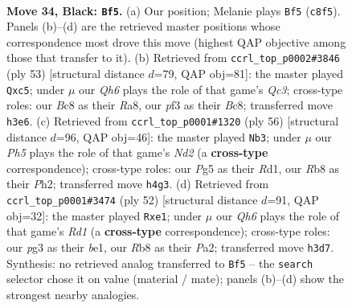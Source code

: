 \documentclass[11pt]{article}
\begin{document}
\clearpage

\begin{figure}[p]\centering
\begin{subfigure}{0.46\textwidth}\centering
\resizebox{\linewidth}{!}{%
\newchessgame
\chessboard[
  setfen={1rb5/pp4k1/n5p1/2pP2p1/7p/P2Q1PPq/1PB4P/2RR2K1 b - - 1 34},
  showmover=false,
  pgfstyle=straightmove, color=movearrow, markmove={c8-f5}
]}
\caption{}
\end{subfigure}\hfill
\begin{subfigure}{0.46\textwidth}\centering
\resizebox{\linewidth}{!}{%
\newchessgame
\chessboard[
  setfen={r1b3k1/5ppp/2qp4/ppP1n1P1/8/1P2R2P/P2B1Q1R/5K2 b - - 0 27},
  showmover=false,
  pgfstyle=straightmove, color=movearrow, markmove={c6-c5}
]}
\caption{}
\end{subfigure}
\\[4pt]
\begin{subfigure}{0.46\textwidth}\centering
\resizebox{\linewidth}{!}{%
\newchessgame
\chessboard[
  setfen={3r3r/1pq5/p3pk2/4p1b1/PP2P1Qp/3B4/2PN2PP/3R3K w - - 1 29},
  showmover=false,
  pgfstyle=straightmove, color=movearrow, markmove={d2-b3}
]}
\caption{}
\end{subfigure}\hfill
\begin{subfigure}{0.46\textwidth}\centering
\resizebox{\linewidth}{!}{%
\newchessgame
\chessboard[
  setfen={1r1qrk2/1bp2ppB/p6p/3pN3/3P1P1P/6P1/P1Q2P2/3Rb1K1 w - - 2 27},
  showmover=false,
  pgfstyle=straightmove, color=movearrow, markmove={d1-e1}
]}
\caption{}
\end{subfigure}
\caption{\textbf{Move 34, Black: \texttt{Bf5}.} (a) Our position; Melanie plays \texttt{Bf5} (\texttt{c8f5}). Panels (b)--(d) are the retrieved master positions whose correspondence most drove this move (highest QAP objective among those that transfer to it). (b) Retrieved from \texttt{ccrl\_top\_p0002\#3846} (ply 53) [structural distance $d$=79, QAP obj=81]: the master played \texttt{Qxc5}; under $\mu$ our \emph{Qh6} plays the role of that game's \emph{Qc3}; cross-type roles: our \emph{B}c8 as their \emph{R}a8, our \emph{p}f3 as their \emph{B}c8; transferred move \texttt{h3e6}. (c) Retrieved from \texttt{ccrl\_top\_p0001\#1320} (ply 56) [structural distance $d$=96, QAP obj=46]: the master played \texttt{Nb3}; under $\mu$ our \emph{Ph5} plays the role of that game's \emph{Nd2} (a \textbf{cross-type} correspondence); cross-type roles: our \emph{P}g5 as their \emph{R}d1, our \emph{R}b8 as their \emph{P}h2; transferred move \texttt{h4g3}. (d) Retrieved from \texttt{ccrl\_top\_p0001\#3474} (ply 52) [structural distance $d$=91, QAP obj=32]: the master played \texttt{Rxe1}; under $\mu$ our \emph{Qh6} plays the role of that game's \emph{Rd1} (a \textbf{cross-type} correspondence); cross-type roles: our \emph{p}g3 as their \emph{b}e1, our \emph{R}b8 as their \emph{P}a2; transferred move \texttt{h3d7}. Synthesis: no retrieved analog transferred to \texttt{Bf5} -- the \texttt{search} selector chose it on value (material / mate); panels (b)--(d) show the strongest nearby analogies.}
\label{fig:thought-m67}
\end{figure}
\end{document}
